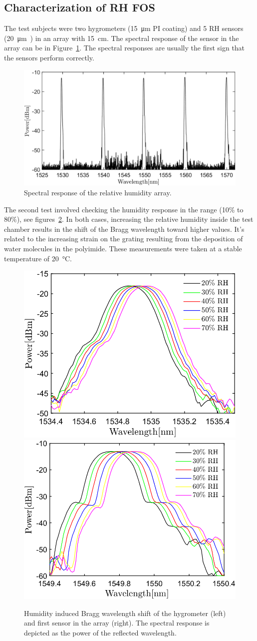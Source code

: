 \subsection{Characterization of RH FOS}
The test subjects were two hygrometers (\SI{15}{\micro\metre} PI coating) and  5 \gls{RH} sensors (\SI{20}{\micro\metre)} in an array with \SI{15}{\cm}. The spectral response of the sensor in the array can be in Figure~\ref{fig_array_wavelength}. The spectral responses are usually the first sign that the sensors perform correctly. 
\begin{figure}[!h]
\centering
\includegraphics[width=0.85\columnwidth]{Chapter5/images/rh_array.png}
\caption{Spectral response of the relative humidity array.}
\label{fig_array_wavelength}
\end{figure}
The second test involved checking the humidity response in the range (10\% to 80\%), see figures~\ref{fig_response}. In both cases, increasing the relative humidity inside the test chamber results in the shift of the Bragg wavelength toward higher values. It's related to the increasing strain on the grating resulting from the deposition of water molecules in the polyimide. These measurements were taken at a stable temperature of \SI{20}{\celsius}.
\begin{figure}[!h]
\centering
\includegraphics[width=0.45\columnwidth]{Chapter5/images/rh.png}
\includegraphics[width=0.47\columnwidth]{Chapter5/images/rh_array2.png}
\caption{Humidity induced Bragg wavelength shift of the hygrometer (left) and first sensor in the array (right). The spectral response is depicted as the power of the reflected wavelength. }
\label{fig_response}
\end{figure}
